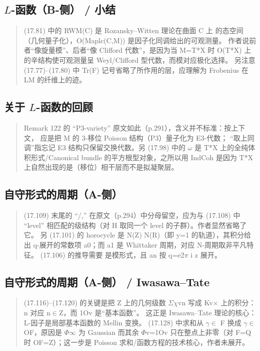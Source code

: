 \subsection*{$L$-函数（B-侧） / 小结}
\begin{quote}\small
(17.81) 中的 RWM(C) 是 Rozansky--Witten 理论在曲面 C 上 的态空间（几何量子化），O(Maplc(C,M)) 是因子化同调给出的可观测量。 作者说前者“像旋量模”、后者“像 Clifford 代数”，是因为当 M=T*X 时 O(T*X) 上的辛结构使可观测量呈 Weyl/Clifford 型代数，而模对应极化选择。 另注意 (17.77)--(17.80) 中 Tr(F) 记号省略了所作用的层，应理解为 Frobenius 在 LM 的纤维上的迹。
\end{quote}

\subsection*{关于 $L$-函数的回顾}
\begin{quote}\small
Remark 122 的 “P3-variety” 原文如此（p.291），含义并不标准：按上下文， 应是把 M 的 3-移位 Poisson 结构（P3）量子化为 E3-代数； “取上同调”指忘记 E3 结构只保留交换代数。另 (17.98) 中的 $\omega$ 是 T*X 上的全纯体积形式/Canonical bundle 的平方根型对象，之所以用 IndCoh 是因为 T*X 上自然出现的是（移位）相干层而不是拟凝聚层。
\end{quote}

\subsection*{自守形式的周期（A-侧）}
\begin{quote}\small
(17.109) 末尾的 “/,” 在原文（p.294）中分母留空，应为与 (17.108) 中 “level” 相匹配的级结构（对 H 取同一个 level 的子群）。作者显然省略了它。 另 (17.101) 的 horocycle 是 N(Z) N(R)（即 y=1 的轨道），其积分给出 q-展开的常数项 a0；而 a1 是 Whittaker 周期，对应 N-周期取非平凡特征。 (17.106) 的推导需要 是模形式，且 an 按 q=e2$\pi$ i z 展开。
\end{quote}

\subsection*{自守形式的周期（A-侧） / Iwasawa--Tate}
\begin{quote}\small
(17.116)--(17.120) 的关键是把 Z 上的几何级数 $\Sigma$$\chi$vn 写成 Kv$\times$ 上的积分：n 对应 n$\in$Z，而 1Ov 是“基本函数”。 这正是 Iwasawa--Tate 理论的核心：L-因子是局部基本函数的 Mellin 变换。 (17.128) 中求和从 $\gamma$$\in$ F 换成 $\gamma$$\in$OF，原因是 $\Phi$$\infty$ 为 Gaussian 而其余 $\Phi$v=1Ov 只在整点上非零（对 F=Q 时 OF=Z）；这一步是 Poisson 求和/函数方程的技术核心，作者未展开。
\end{quote}

